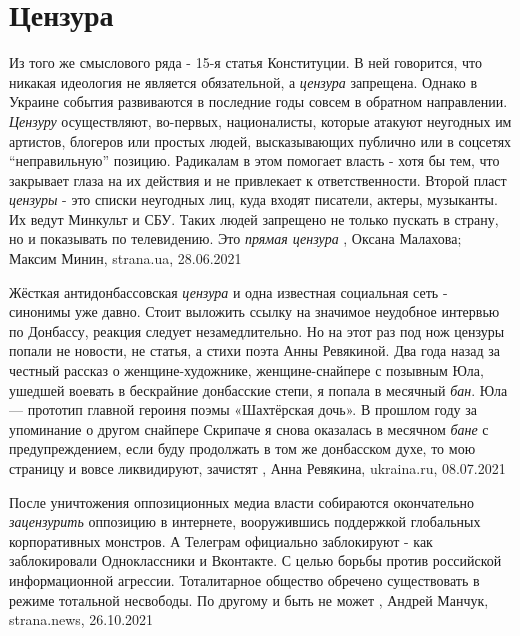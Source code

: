  
 
 
 
 
\chapter{Цензура}
\label{sec:slova.cenzura}

Из того же смыслового ряда - 15-я статья Конституции. В ней говорится, что
никакая идеология не является обязательной, а \emph{цензура} запрещена.
Однако в Украине события развиваются в последние годы совсем в обратном
направлении.
\emph{Цензуру} осуществляют, во-первых, националисты, которые атакуют неугодных им
артистов, блогеров или простых людей, высказывающих публично или в соцсетях
\enquote{неправильную} позицию. Радикалам в этом помогает власть - хотя бы тем, что
закрывает глаза на их действия и не привлекает к ответственности.
Второй пласт \emph{цензуры} - это списки неугодных лиц, куда входят писатели, актеры,
музыканты. Их ведут Минкульт и СБУ. Таких людей запрещено не только пускать в
страну, но и показывать по телевидению. Это \emph{прямая цензура}
, 
Оксана Малахова; Максим Минин, strana.ua, 28.06.2021

Жёсткая антидонбассовская \emph{цензура} и одна известная социальная сеть -
синонимы уже давно. Стоит выложить ссылку на значимое неудобное интервью по
Донбассу, реакция следует незамедлительно. Но на этот раз под нож цензуры
попали не новости, не статья, а стихи поэта Анны Ревякиной. Два года назад за
честный рассказ о женщине-художнике, женщине-снайпере с позывным Юла, ушедшей
воевать в бескрайние донбасские степи, я попала в месячный \emph{бан}. Юла — прототип
главной героиня поэмы «Шахтёрская дочь». В прошлом году за упоминание о другом
снайпере Скрипаче я снова оказалась в месячном \emph{бане} с предупреждением, если
буду продолжать в том же донбасском духе, то мою страницу и вовсе ликвидируют,
зачистят
, Анна Ревякина, ukraina.ru, 08.07.2021

После уничтожения оппозиционных медиа власти собираются окончательно
\emph{зацензурить} оппозицию в интернете, вооружившись поддержкой глобальных
корпоративных монстров.  А Телеграм официально заблокируют - как заблокировали
Одноклассники и Вконтакте. С целью борьбы против российской информационной
агрессии.  Тоталитарное общество обречено существовать в режиме тотальной
несвободы. По другому и быть не может
, 
Андрей Манчук, strana.news, 26.10.2021

